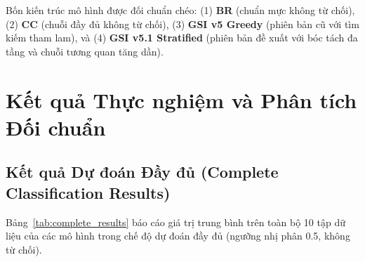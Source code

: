 \documentclass[11pt,a4paper]{article}
\begin{document}
Bốn kiến trúc mô hình được đối chuẩn chéo: (1) \textbf{BR} (chuẩn mực không từ chối), (2) \textbf{CC} (chuỗi đầy đủ không từ chối), (3) \textbf{GSI v5 Greedy} (phiên bản cũ với tìm kiếm tham lam), và (4) \textbf{GSI v5.1 Stratified} (phiên bản đề xuất với bóc tách đa tầng và chuỗi tương quan tăng dần).

\section{Kết quả Thực nghiệm và Phân tích Đối chuẩn}
\label{sec:results}

\subsection{Kết quả Dự đoán Đầy đủ (Complete Classification Results)}
Bảng~\ref{tab:complete_results} báo cáo giá trị trung bình trên toàn bộ 10 tập dữ liệu của các mô hình trong chế độ dự đoán đầy đủ (ngưỡng nhị phân 0.5, không từ chối).
\end{document}
